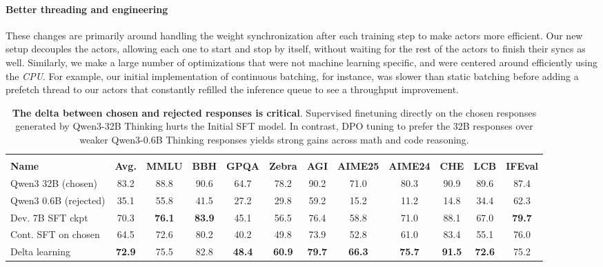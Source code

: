 \documentclass[table]{ai2style/ai2}
\newcommand{\olmothreethinking}{\textsc{Olmo~3 Think}\xspace}
\begin{document}
{{\paragraph{Better threading and engineering}{ These changes are primarily around handling the weight synchronization after each training step to make actors more efficient. 
Our new setup decouples the actors, allowing each one to start and stop by itself, without waiting for the rest of the actors to finish their syncs as well.
Similarly, we make a large number of optimizations that were not machine learning specific, and were centered around efficiently using the \emph{CPU}.}
For example, our initial implementation of continuous batching, for instance, was slower than static batching before adding a prefetch thread to our actors that constantly refilled the inference queue to see a throughput improvement.

\begin{table}[tbp]
\centering
\small
\begin{tabular}{@{}l >{\columncolor{ai2pink!18}}c cccccccccc@{}}
\toprule
& \multicolumn{11}{c}{\textbf{Subset of \olmothreethinking Benchmarks}} \\
\cmidrule(lr){2-12}
\textbf{Name} & \cellcolor{ai2pink!18}\textbf{Avg.} & \textbf{MMLU} & \textbf{BBH} & \textbf{GPQA} & \textbf{Zebra} & \textbf{AGI} & \textbf{AIME25} & \textbf{AIME24} & \textbf{CHE} & \textbf{LCB} & \textbf{IFEval} \\
\midrule
Qwen3 32B (chosen) & 83.2 & 88.8 & 90.6 & 64.7 & 78.2 & 90.2 & 71.0 & 80.3 & 90.9 & 89.6 & 87.4 \\
Qwen3 0.6B (rejected) & 35.1 & 55.8 & 41.5 & 27.2 & 29.8 & 59.2 & 15.2 & 11.2 & 14.8 & 34.4 & 62.3 \\
\midrule
Dev. 7B SFT ckpt & 70.3 & {\bf 76.1} & {\bf 83.9} & 45.1 & 56.5 & 76.4 & 58.8 & 71.0 & 88.1 & 67.0 & {\bf 79.7} \\
Cont. SFT on chosen & 64.5 & 72.6 & 80.2 & 40.2 & 49.8 & 73.9 & 52.8 & 61.0 & 83.4 & 55.1 & 76.0 \\
Delta learning & {\bf 72.9} & 75.5 & 82.8 & {\bf 48.4} & {\bf 60.9} & {\bf 79.7} & {\bf 66.3} & {\bf 75.7} & {\bf 91.5} & {\bf 72.6} & 75.2 \\
\bottomrule
\end{tabular}
\caption{\textbf{The delta between chosen and rejected responses is critical}. Supervised finetuning directly on the chosen responses generated by Qwen3-32B Thinking hurts the Initial SFT model. In contrast, DPO tuning to prefer the 32B responses over weaker Qwen3-0.6B Thinking responses yields strong gains across math and code reasoning.}
\label{tab:dpo_sftchosen}
\end{table}

}}
\end{document}

